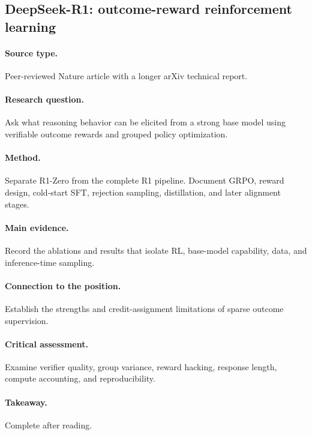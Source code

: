 \subsection{DeepSeek-R1: outcome-reward reinforcement learning
\citep{guo2025deepseekr1}}
\paragraph{Source type.} Peer-reviewed Nature article with a longer arXiv technical report.
\paragraph{Research question.} Ask what reasoning behavior can be elicited from a strong base model using verifiable outcome rewards and grouped policy optimization.
\paragraph{Method.} Separate R1-Zero from the complete R1 pipeline. Document GRPO, reward design, cold-start SFT, rejection sampling, distillation, and later alignment stages.
\paragraph{Main evidence.} Record the ablations and results that isolate RL, base-model capability, data, and inference-time sampling.
\paragraph{Connection to the position.} Establish the strengths and credit-assignment limitations of sparse outcome supervision.
\paragraph{Critical assessment.} Examine verifier quality, group variance, reward hacking, response length, compute accounting, and reproducibility.
\paragraph{Takeaway.} Complete after reading.
